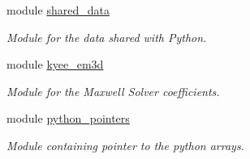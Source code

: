 \begin{DoxyCompactItemize}
module \hyperlink{namespaceshared__data}{shared\+\_\+data}
\begin{DoxyCompactList}\small\item\em Module for the data shared with Python. \end{DoxyCompactList}\item 
module \hyperlink{namespacekyee__em3d}{kyee\+\_\+em3d}
\begin{DoxyCompactList}\small\item\em Module for the Maxwell Solver coefficients. \end{DoxyCompactList}\item 
module \hyperlink{namespacepython__pointers}{python\+\_\+pointers}
\begin{DoxyCompactList}\small\item\em Module containing pointer to the python arrays. \end{DoxyCompactList}\end{DoxyCompactItemize}
